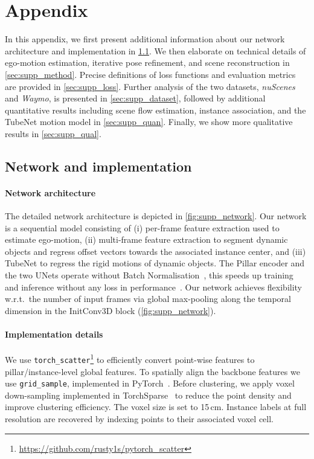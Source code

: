 \section{Appendix}
In this appendix, we first present additional information about our network architecture and implementation in \cref{sec:supp_network}. We then elaborate on technical details of ego-motion estimation, iterative pose refinement, and scene reconstruction in \cref{sec:supp_method}. Precise definitions of loss functions and evaluation metrics are provided in \cref{sec:supp_loss}. Further analysis of the two datasets, \emph{nuScenes} and \emph{Waymo}, is presented in \cref{sec:supp_dataset}, followed by additional quantitative results including scene flow estimation, instance association, and the TubeNet motion model in \cref{sec:supp_quan}. Finally, we show more qualitative results in \cref{sec:supp_qual}. 

\subsection{Network and implementation}
\label{sec:supp_network}

\paragraph{Network architecture}
The detailed network architecture is depicted in \cref{fig:supp_network}. Our network is a sequential model consisting of (i) per-frame feature extraction used to estimate ego-motion, (ii) multi-frame feature extraction to segment dynamic objects and regress offset vectors towards the associated instance center, and (iii) TubeNet to regress the rigid motions of dynamic objects. The Pillar encoder and the two UNets operate without Batch Normalisation~\cite{ioffe2015batch}, this speeds up training and inference without any loss in performance~\cite{peng2020convolutional}. Our network achieves flexibility w.r.t.\ the number of input frames via global max-pooling along the temporal dimension in the InitConv3D block (\cref{fig:supp_network}).

\paragraph{Implementation details}
We use \texttt{torch\_scatter}\footnote{\url{https://github.com/rusty1s/pytorch_scatter}} to efficiently convert point-wise features to pillar/instance-level global features. To spatially align the backbone features we use \texttt{grid\_sample}, implemented in PyTorch~\cite{NEURIPS2019_9015}. Before clustering, we apply voxel down-sampling implemented in TorchSparse~\cite{tang2022torchsparse} to reduce the point density and improve clustering efficiency. The voxel size is set to 15$\,$cm. Instance labels at full resolution are recovered by indexing points to their associated voxel cell. 


